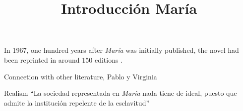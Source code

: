 \documentclass[12pt]{article}
\title{Introducción María}
\makeatletter
\newcommand\iraggedright{%
	\let\\\@centercr\@rightskip\@flushglue \rightskip\@rightskip
	\leftskip\z@skip}
\makeatother
\begin{document}
	\makeheader
	\iraggedright

In 1967, one hundred years after \textit{María} was initially published, the novel had been reprinted in around 150 editions \cite[13]{McGrady2012}.

Conncetion with other literature, Pablo y Virginia

Realism
\enquote{La sociedad representada en \textit{María} nada tiene de ideal, puesto que admite la institución repelente de la esclavitud} \cite[24]{Mcgrady2012}
\makeworkscited
\listoftodos
\end{document}
